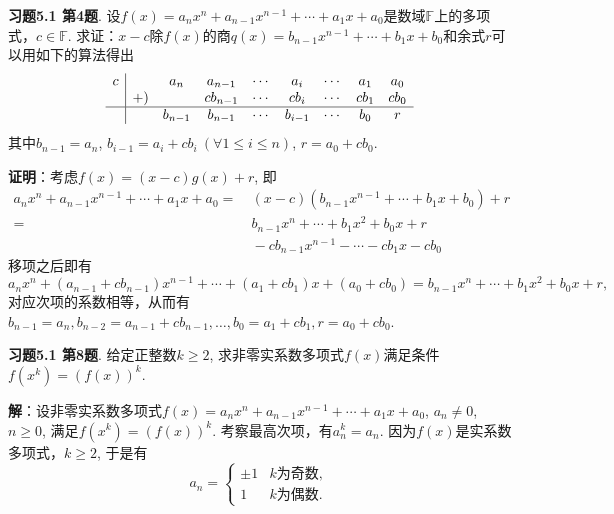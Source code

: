 
\renewcommand{\newpageorvspace}{\vspace{2em}}

\date{2021-11-26  第五次习题课}



\maketitle

{\bf 习题5.1 第4题}. 设$f(x) = a_nx^n + a_{n-1}x^{n-1} + \cdots + a_1x + a_0$是数域$\mathbb{F}$上的多项式，$c\in\mathbb{F}$. 求证：$x-c$除$f(x)$的商$q(x) = b_{n-1}x^{n-1} + \cdots + b_1x + b_0$和余式$r$可以用如下的算法得出
$$
\begin{array}{c|cccccccc}
c & & a_n & a_{n-1} & \cdots & a_i & \cdots & a_1 & a_0 \\
& +) & & cb_{n-1} & \cdots & cb_i & \cdots & cb_1 & cb_0 \\ \hline
& & b_{n-1} & b_{n-1} & \cdots & b_{i-1} & \cdots & b_0 & r
\end{array}
$$
其中$b_{n-1} = a_n$, $b_{i-1} = a_i + cb_i \ (\forall 1 \leqslant i \leqslant n)$, $r = a_0 + cb_0$.

{\bf 证明}：考虑$f(x) = (x-c)g(x) + r$, 即
\begin{align*}
a_nx^n + a_{n-1}x^{n-1} + \cdots + a_1x + a_0 = & \ (x-c) (b_{n-1}x^{n-1} + \cdots + b_1x + b_0) + r \\
= & \ b_{n-1}x^{n} + \cdots + b_1x^2 + b_0x + r \\
& \ - cb_{n-1}x^{n-1} - \cdots - cb_1x - cb_0
\end{align*}
移项之后即有
$$a_nx^n + (a_{n-1}+cb_{n-1})x^{n-1} + \cdots + (a_1+cb_1)x + (a_0 + cb_0) = b_{n-1}x^{n} + \cdots + b_1x^2 + b_0x + r,$$
对应次项的系数相等，从而有$b_{n-1} = a_n, b_{n-2} = a_{n-1}+cb_{n-1}, \ldots, b_0 = a_1+cb_1, r = a_0 + cb_0$.

\newpageorvspace


{\bf 习题5.1 第8题}. 给定正整数$k\geqslant 2$, 求非零实系数多项式$f(x)$满足条件$f(x^k) = (f(x))^k$.

{\bf 解}：设非零实系数多项式$f(x) = a_nx^n + a_{n-1}x^{n-1} + \cdots + a_1x + a_0$, $a_n\neq 0$, $n\geqslant 0$, 满足$f(x^k) = (f(x))^k$. 考察最高次项，有$a_n^k = a_n$. 因为$f(x)$是实系数多项式，$k\geqslant 2$, 于是有
$$a_n = \begin{cases}\pm 1 & \text{$k$为奇数}, \\ 1 & \text{$k$为偶数}. \end{cases}$$

